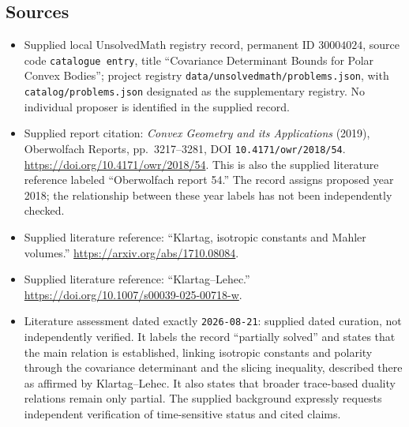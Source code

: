 \documentclass[11pt]{article}
\begin{document}
\subsection{Sources}
\begin{itemize}
\item Supplied local UnsolvedMath registry record, permanent ID \(30004024\), source code \texttt{catalogue entry}, title ``Covariance Determinant Bounds for Polar Convex Bodies''; project registry \texttt{data/unsolvedmath/problems.json}, with \texttt{catalog/problems.json} designated as the supplementary registry. No individual proposer is identified in the supplied record.
\item Supplied report citation: \emph{Convex Geometry and its Applications} (2019), Oberwolfach Reports, pp.~3217--3281, DOI \texttt{10.4171/owr/2018/54}. \url{https://doi.org/10.4171/owr/2018/54}. This is also the supplied literature reference labeled ``Oberwolfach report 54.'' The record assigns proposed year 2018; the relationship between these year labels has not been independently checked.
\item Supplied literature reference: ``Klartag, isotropic constants and Mahler volumes.'' \url{https://arxiv.org/abs/1710.08084}.
\item Supplied literature reference: ``Klartag--Lehec.'' \url{https://doi.org/10.1007/s00039-025-00718-w}.
\item Literature assessment dated exactly \texttt{2026-08-21}: supplied dated curation, not independently verified. It labels the record ``partially solved'' and states that the main relation is established, linking isotropic constants and polarity through the covariance determinant and the slicing inequality, described there as affirmed by Klartag--Lehec. It also states that broader trace-based duality relations remain only partial. The supplied background expressly requests independent verification of time-sensitive status and cited claims.
\end{itemize}
\end{document}
